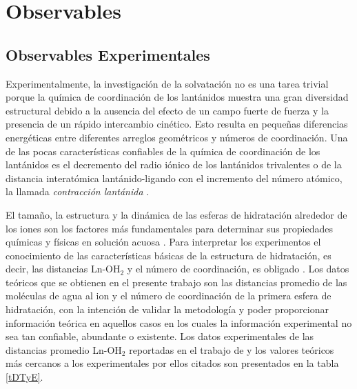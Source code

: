 \section*{Observables}
\subsection*{Observables Experimentales}
Experimentalmente, la investigaci\'on de la solvataci\'on no es una 
tarea trivial porque la qu\'imica de coordinaci\'on de los lant\'anidos
muestra una gran diversidad estructural debido a la ausencia del 
efecto de un campo fuerte de fuerza y la presencia de un r\'apido 
intercambio cin\'etico. Esto resulta en peque\~nas diferencias 
energ\'eticas entre diferentes arreglos geom\'etricos y n\'umeros de
coordinaci\'on. Una de las pocas caracter\'isticas confiables de la
qu\'imica de coordinaci\'on de los lant\'anidos es el decremento del
radio i\'onico de los lant\'anidos trivalentes o de la distancia
interat\'omica lant\'anido-ligando con el incremento del n\'umero
at\'omico, la llamada {\it contracci\'on lant\'anida} 
\citep{Shar2013}. 

El tama\~no, la estructura y la din\'amica de las esferas de 
hidrataci\'on alrededor de los iones son los factores m\'as 
fundamentales para determinar sus propiedades qu\'imicas y f\'isicas
en soluci\'on acuosa \citep{Shar2013}. Para interpretar los 
experimentos el conocimiento de las caracter\'isticas b\'asicas de la
estructura de hidrataci\'on, es decir, las distancias Ln-OH$_2$ y el 
n\'umero de coordinaci\'on, es obligado \citep{Dang2012}.  
Los datos te\'oricos que se obtienen en el presente trabajo son las 
distancias promedio de las mol\'eculas de agua al ion y el n\'umero 
de coordinaci\'on de la primera esfera de hidrataci\'on, con la 
intenci\'on de validar la metodolog\'ia y poder proporcionar 
informaci\'on te\'orica en aquellos casos en los cuales la 
informaci\'on experimental no sea tan confiable, abundante o 
existente. Los datos experimentales de las distancias promedio 
Ln-OH$_2$ reportadas en el trabajo de \cite{Dang2012} y los valores
te\'oricos m\'as cercanos a los experimentales por ellos citados son
presentados en la tabla \ref{tDTyE}.


